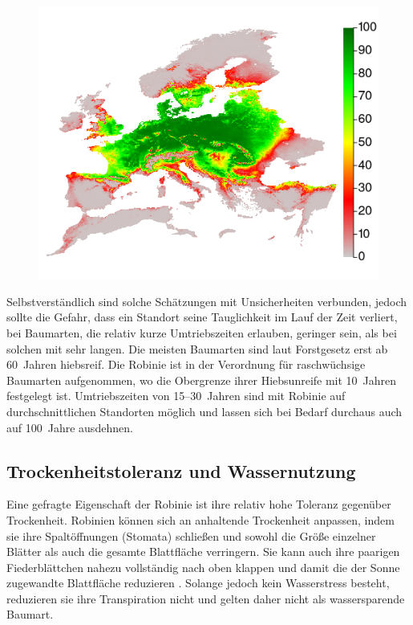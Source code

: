 \documentclass[twocolumn]{scrartcl}
\begin{document}
\begin{figure}[htbp]
  \centering
  \includegraphics[width=.9\linewidth]{./bild/potentialEuropaZukunft85}
  \label{fig:verbreitungEuPotZukunft}
\end{figure}

Selbstverständlich sind solche Schätzungen mit Unsicherheiten verbunden, jedoch sollte die Gefahr, dass ein Standort seine Tauglichkeit im Lauf der Zeit verliert, bei Baumarten, die relativ kurze Umtriebszeiten erlauben, geringer sein, als bei solchen mit sehr langen. Die meisten Baumarten sind laut Forstgesetz erst ab 60~Jahren hiebsreif. Die Robinie ist in der Verordnung für raschwüchsige Baumarten aufgenommen, wo die Obergrenze ihrer Hiebsunreife mit 10~Jahren festgelegt ist. Umtriebszeiten von 15--30~Jahren sind mit Robinie auf durchschnittlichen Standorten möglich und lassen sich bei Bedarf durchaus auch auf 100~Jahre ausdehnen.

\subsection{Trockenheitstoleranz und Wassernutzung} %

Eine gefragte Eigenschaft der Robinie ist ihre relativ hohe Toleranz gegenüber Trockenheit. Robinien können sich an anhaltende Trockenheit anpassen, indem sie ihre Spaltöffnungen (Stomata) schließen und sowohl die Größe einzelner Blätter als auch die gesamte Blattfläche verringern. Sie kann auch ihre paarigen Fiederblättchen nahezu vollständig nach oben klappen und damit die der Sonne zugewandte Blattfläche reduzieren \citep{schildknecht1984blattbewegung}. Solange jedoch kein Wasserstress besteht, reduzieren sie ihre Transpiration nicht und gelten daher nicht als wassersparende Baumart.
\end{document}
